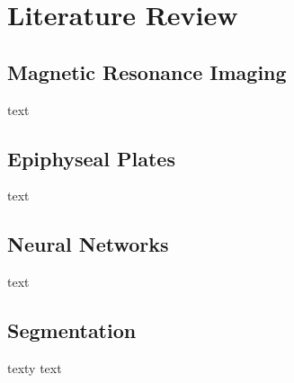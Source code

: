 \section{Literature Review}

\subsection{Magnetic Resonance Imaging}

text

\subsection{Epiphyseal Plates}

text

\subsection{Neural Networks}

text

\subsection{Segmentation}

texty text

\newpage